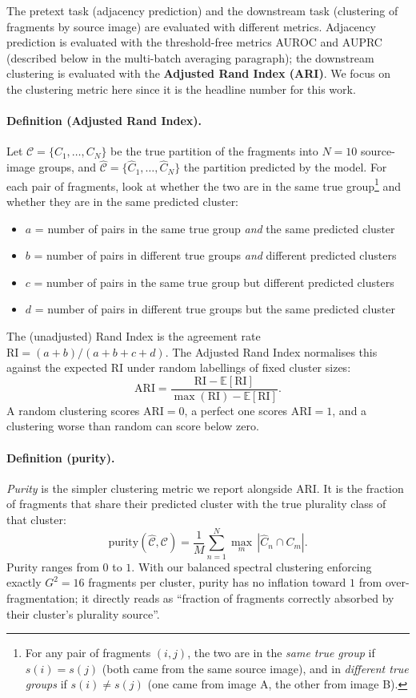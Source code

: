 \documentclass[12pt, a4paper]{article}
\begin{document}
The pretext task (adjacency prediction) and the downstream task (clustering of
fragments by source image) are evaluated with different metrics. Adjacency
prediction is evaluated with the threshold-free metrics AUROC and AUPRC (described
below in the multi-batch averaging paragraph); the downstream clustering is
evaluated with the \textbf{Adjusted Rand Index (ARI)}. We focus on the clustering
metric here since it is the headline number for this work.

\paragraph{Definition (Adjusted Rand Index).}
Let $\mathcal{C} = \{C_1, \dots, C_N\}$ be the true partition of the fragments
into $N = 10$ source-image groups, and $\hat{\mathcal{C}} = \{\hat{C}_1, \dots,
\hat{C}_N\}$ the partition predicted by the model. For each pair of fragments, look
at whether the two are in the same true group\footnote{For any pair of fragments
$(i, j)$, the two are in the \emph{same true group} if $s(i) = s(j)$ (both came
from the same source image), and in \emph{different true groups} if
$s(i) \neq s(j)$ (one came from image A, the other from image B).} and whether
they are in the same predicted cluster:

\begin{itemize}
    \item $a$ = number of pairs in the same true group \emph{and} the same predicted cluster
    \item $b$ = number of pairs in different true groups \emph{and} different predicted clusters
    \item $c$ = number of pairs in the same true group but different predicted clusters
    \item $d$ = number of pairs in different true groups but the same predicted cluster
\end{itemize}

The (unadjusted) Rand Index is the agreement rate $\text{RI} = (a + b) / (a + b + c + d)$.
The Adjusted Rand Index normalises this against the expected RI under random labellings
of fixed cluster sizes:
\[
\text{ARI} = \frac{\text{RI} - \mathbb{E}[\text{RI}]}{\max(\text{RI}) - \mathbb{E}[\text{RI}]}.
\]
A random clustering scores $\text{ARI} = 0$, a perfect one scores $\text{ARI} = 1$,
and a clustering worse than random can score below zero.

\paragraph{Definition (purity).}
\emph{Purity} is the simpler clustering metric we report alongside ARI. It is
the fraction of fragments that share their predicted cluster with the true
plurality class of that cluster:
\[
\text{purity}(\hat{\mathcal{C}}, \mathcal{C})
= \frac{1}{M}\sum_{n=1}^{N} \max_{m} \,|\hat{C}_n \cap C_m|.
\]
Purity ranges from $0$ to $1$. With our balanced spectral clustering enforcing
exactly $G^2 = 16$ fragments per cluster, purity has no inflation toward $1$
from over-fragmentation; it directly reads as ``fraction of fragments
correctly absorbed by their cluster's plurality source''.
\end{document}
